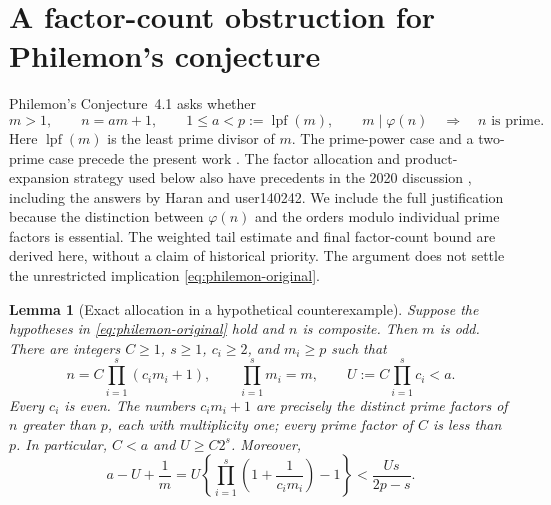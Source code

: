 \documentclass[11pt,a4paper]{article}
\newtheorem{lemma}[theorem]{Lemma}
\theoremstyle{definition}\newtheorem{definition}[theorem]{Definition}
\theoremstyle{remark}\newtheorem{remark}[theorem]{Remark}
\begin{document}
\section{A factor-count obstruction for Philemon's conjecture}
\label{sec:philemon-obstruction}

Philemon's Conjecture~4.1 asks whether
\begin{equation}\label{eq:philemon-original}
 m>1,\qquad n=am+1,\qquad 1\leq a<p:=\operatorname{lpf}(m),
 \qquad m\mid\varphi(n)
 \quad\Longrightarrow\quad n\text{ is prime}.
\end{equation}
Here $\operatorname{lpf}(m)$ is the least prime divisor of $m$.
The prime-power case and a two-prime case precede the present work
\cite{philemon2021,philemonMSE}.  The factor allocation and product-expansion
strategy used below also have precedents in the 2020 discussion
\cite{philemonMSE}, including the answers by Haran and user140242.
We include the full justification because the distinction between
$\varphi(n)$ and the orders modulo individual prime factors is essential.
The weighted tail estimate and final factor-count bound are derived here,
without a claim of historical priority.  The argument does
not settle the unrestricted implication \eqref{eq:philemon-original}.

\begin{lemma}[Exact allocation in a hypothetical counterexample]
\label{lem:philemon-allocation}
Suppose the hypotheses in \eqref{eq:philemon-original} hold and $n$ is
composite.  Then $m$ is odd.  There are integers $C\geq1$, $s\geq1$,
$c_i\geq2$, and $m_i\geq p$ such that
\begin{equation}\label{eq:philemon-allocation}
 n=C\prod_{i=1}^s(c_i m_i+1),\qquad
 \prod_{i=1}^s m_i=m,\qquad
 U:=C\prod_{i=1}^s c_i<a.
\end{equation}
Every $c_i$ is even.  The numbers $c_i m_i+1$ are precisely the distinct
prime factors of $n$ greater than $p$, each with multiplicity one; every
prime factor of $C$ is less than $p$.  In particular, $C<a$ and
$U\geq C2^s$.  Moreover,
\begin{equation}\label{eq:philemon-tail}
 a-U+\frac1m
 =U\left\{\prod_{i=1}^s\left(1+\frac1{c_i m_i}\right)-1\right\}
 <\frac{Us}{2p-s}.
\end{equation}
\end{lemma}
\end{document}
